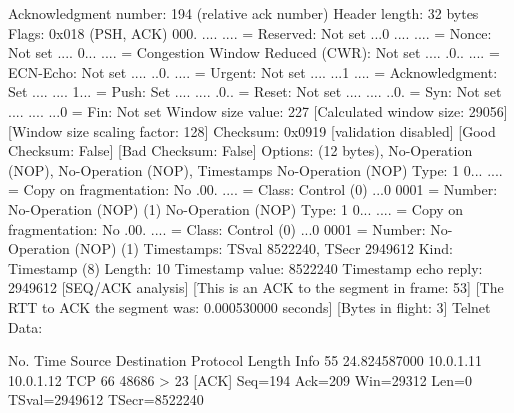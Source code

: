     Acknowledgment number: 194    (relative ack number)
    Header length: 32 bytes
    Flags: 0x018 (PSH, ACK)
        000. .... .... = Reserved: Not set
        ...0 .... .... = Nonce: Not set
        .... 0... .... = Congestion Window Reduced (CWR): Not set
        .... .0.. .... = ECN-Echo: Not set
        .... ..0. .... = Urgent: Not set
        .... ...1 .... = Acknowledgment: Set
        .... .... 1... = Push: Set
        .... .... .0.. = Reset: Not set
        .... .... ..0. = Syn: Not set
        .... .... ...0 = Fin: Not set
    Window size value: 227
    [Calculated window size: 29056]
    [Window size scaling factor: 128]
    Checksum: 0x0919 [validation disabled]
        [Good Checksum: False]
        [Bad Checksum: False]
    Options: (12 bytes), No-Operation (NOP), No-Operation (NOP), Timestamps
        No-Operation (NOP)
            Type: 1
                0... .... = Copy on fragmentation: No
                .00. .... = Class: Control (0)
                ...0 0001 = Number: No-Operation (NOP) (1)
        No-Operation (NOP)
            Type: 1
                0... .... = Copy on fragmentation: No
                .00. .... = Class: Control (0)
                ...0 0001 = Number: No-Operation (NOP) (1)
        Timestamps: TSval 8522240, TSecr 2949612
            Kind: Timestamp (8)
            Length: 10
            Timestamp value: 8522240
            Timestamp echo reply: 2949612
    [SEQ/ACK analysis]
        [This is an ACK to the segment in frame: 53]
        [The RTT to ACK the segment was: 0.000530000 seconds]
        [Bytes in flight: 3]
Telnet
    Data: 

No.     Time           Source                Destination           Protocol Length Info
     55 24.824587000   10.0.1.11             10.0.1.12             TCP      66     48686 > 23 [ACK] Seq=194 Ack=209 Win=29312 Len=0 TSval=2949612 TSecr=8522240

